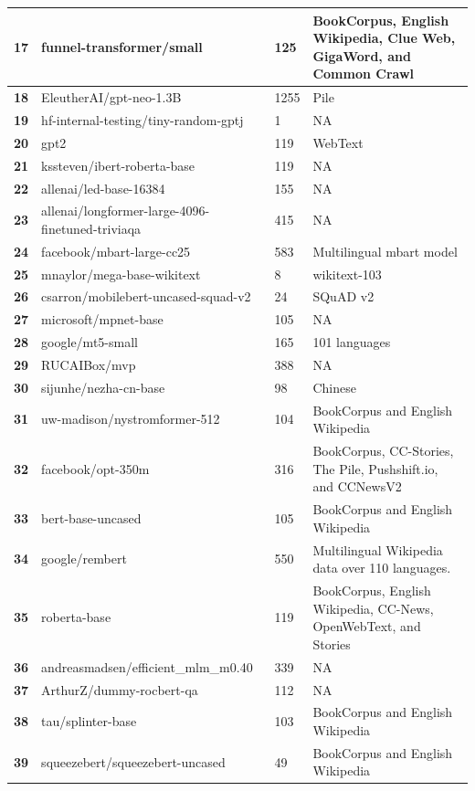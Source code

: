 \documentclass[11pt]{article}
\begin{document}
\begin{table}[htbp]
{\begin{tabular}{|l|l|l|l|}
\textbf{17} & funnel-transformer/small  & 125 & BookCorpus, English Wikipedia, Clue Web, GigaWord, and Common Crawl \\ \hline
\textbf{18} & EleutherAI/gpt-neo-1.3B  & 1255 & Pile \\ \hline
\textbf{19} & hf-internal-testing/tiny-random-gptj & 1 & NA \\ \hline
\textbf{20} & gpt2 & 119 & WebText \\ \hline
\textbf{21} & kssteven/ibert-roberta-base  & 119 & NA \\ \hline
\textbf{22} & allenai/led-base-16384 & 155 & NA \\ \hline
\textbf{23} & allenai/longformer-large-4096-finetuned-triviaqa & 415 & NA \\ \hline
\textbf{24} & facebook/mbart-large-cc25 & 583 & Multilingual mbart model \\ \hline
\textbf{25} & mnaylor/mega-base-wikitext & 8 & wikitext-103 \\ \hline
\textbf{26} & csarron/mobilebert-uncased-squad-v2 & 24 & SQuAD v2 \\ \hline
\textbf{27} & microsoft/mpnet-base & 105 & NA \\ \hline
\textbf{28} & google/mt5-small & 165 & 101 languages \\ \hline
\textbf{29} & RUCAIBox/mvp  & 388 & NA \\ \hline
\textbf{30} & sijunhe/nezha-cn-base & 98 & Chinese \\ \hline
\textbf{31} & uw-madison/nystromformer-512 & 104 & BookCorpus and English Wikipedia \\ \hline
\textbf{32} & facebook/opt-350m  & 316 & BookCorpus, CC-Stories, The Pile, Pushshift.io, and CCNewsV2 \\ \hline
\textbf{33} & bert-base-uncased  & 105 & BookCorpus and English Wikipedia \\ \hline
\textbf{34} & google/rembert  & 550 & Multilingual Wikipedia data over 110 languages. \\ \hline
\textbf{35} & roberta-base  & 119 & BookCorpus, English Wikipedia, CC-News, OpenWebText, and Stories \\ \hline
\textbf{36} & andreasmadsen/efficient\_mlm\_m0.40 & 339 & NA \\ \hline
\textbf{37} & ArthurZ/dummy-rocbert-qa & 112 & NA \\ \hline
\textbf{38} & tau/splinter-base  & 103 & BookCorpus and English Wikipedia \\ \hline
\textbf{39} & squeezebert/squeezebert-uncased  & 49 & BookCorpus and English Wikipedia \\ \hline

\end{tabular}}
\end{table}
\end{document}
